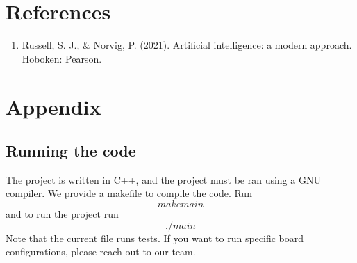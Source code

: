 \documentclass[12pt, a4paper]{article}
\begin{document}
	\section{References}
		\begin{enumerate}
			\item Russell, S. J., \& Norvig, P. (2021). Artificial intelligence: a modern approach. Hoboken: Pearson.
		\end{enumerate}
	\section{Appendix}
		\subsection{Running the code}
			The project is written in C++, and the project must be ran using a GNU compiler. We provide a makefile to compile the code. Run 
			$$make main$$
			and to run the project run
			$$./main$$
			Note that the current file runs tests. If you want to run specific board configurations, please reach out to our team.
\end{document}
